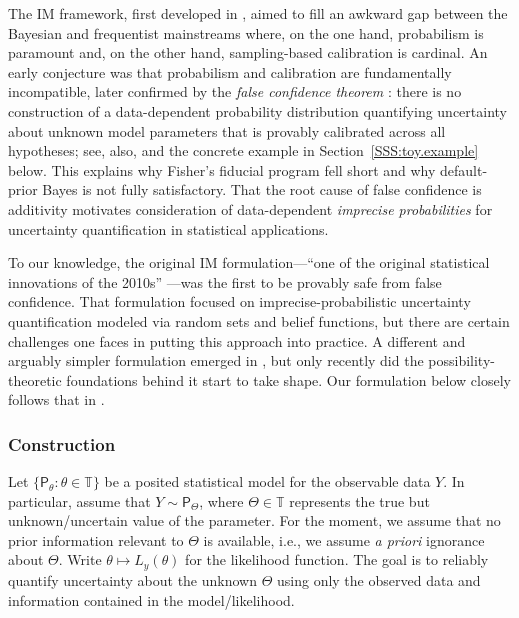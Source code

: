 \documentclass[12pt]{article}
\def\TT{\mathbb{T}}
\def\prob{\mathsf{P}}
\begin{document}
The IM framework, first developed in \citet{imbasics, imbook}, aimed to fill an awkward gap between the Bayesian and frequentist mainstreams where, on the one hand, probabilism is paramount and, on the other hand, sampling-based calibration is cardinal.  An early conjecture was that probabilism and calibration are fundamentally incompatible, later confirmed by the {\em false confidence theorem} \citep{balch2019satellite}: there is no construction of a data-dependent probability distribution quantifying uncertainty about unknown model parameters that is provably calibrated across all hypotheses; see, also, \citet{martin.nonadditive, martin.belief2024} and the concrete example in Section~\ref{SSS:toy.example} below.  This explains why Fisher's fiducial program fell short and why default-prior Bayes is not fully satisfactory.  That the root cause of false confidence is additivity motivates consideration of data-dependent {\em imprecise probabilities} for uncertainty quantification in statistical applications.  

To our knowledge, the original IM formulation---``one of the original statistical innovations of the 2010s'' \citep{cui.hannig.im}---was the first to be provably safe from false confidence.  That formulation focused on imprecise-probabilistic uncertainty quantification modeled via random sets and belief functions, but there are certain challenges one faces in putting this approach into practice.  A different and arguably simpler formulation emerged in \citet{plausfn, gim}, but only recently did the possibility-theoretic foundations behind it start to take shape.  Our formulation below closely follows that in  \cite{martin2022valid2}. 


\subsubsection{Construction}

Let $\{\prob_\theta: \theta \in \TT\}$ be a posited statistical model for the observable data $Y$.  In particular, assume that $Y \sim \prob_\Theta$, where $\Theta \in \TT$ represents the true but unknown/uncertain value of the parameter.  For the moment, we assume that no prior information relevant to $\Theta$ is available, i.e., we assume {\em a priori} ignorance about $\Theta$.  Write $\theta \mapsto L_y(\theta)$ for the likelihood function.  The goal is to reliably quantify uncertainty about the unknown $\Theta$ using only the observed data and information contained in the model/likelihood.  
\end{document}
